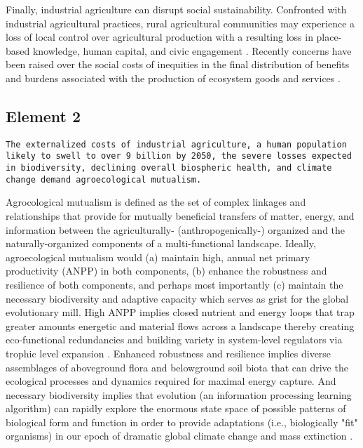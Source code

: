 Finally, industrial agriculture can disrupt social sustainability. Confronted with industrial agricultural practices, rural agricultural communities may experience a loss of local control over agricultural production with a resulting loss in place-based knowledge, human capital, and civic engagement \citep{beus_conventional_1990, oecd_well-being_2001}. Recently concerns have been raised over the social costs of inequities in the final distribution of benefits and burdens associated with the production of ecosystem goods and services \citep{berbes-blazquez_towards_2016}.

\subsection{Element 2}
\begin{sloppypar}
\noindent \texttt{The externalized costs of industrial agriculture, a human population likely to swell to over 9 billion by 2050, the severe losses expected in biodiversity, declining overall biospheric health, and climate change demand agroecological mutualism.} \\
\end{sloppypar}

Agrocological mutualism is defined as the set of complex linkages and relationships that provide for mutually beneficial transfers of matter, energy, and information between the agriculturally- (anthropogenically-) organized and the naturally-organized components of a multi-functional landscape. Ideally, agroecological mutualism would (a) maintain high, annual net primary productivity (ANPP) in both components, (b) enhance the robustness and resilience of both components, and perhaps most importantly (c) maintain the necessary biodiversity and adaptive capacity which serves as grist for the global evolutionary mill.  High ANPP implies closed nutrient and energy loops that trap greater amounts energetic and material flows across a landscape thereby creating eco-functional redundancies and building variety in system-level regulators via trophic level expansion \citep{ashby_introduction_1955}. Enhanced robustness and resilience implies diverse assemblages of aboveground flora and belowground soil biota that can drive the ecological processes and dynamics required for maximal energy capture. And necessary biodiversity implies that evolution (an information processing learning algorithm) can rapidly explore the enormous state space of possible patterns of biological form and function in order to provide adaptations (i.e., biologically "fit" organisms) in our epoch of dramatic global climate change and mass extinction \citep{ceballos_accelerated_2015}.\\

